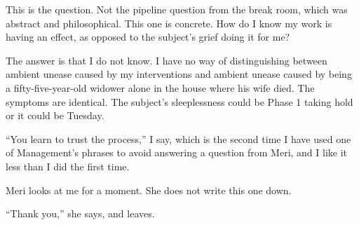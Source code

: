 This is the question. Not the pipeline question from the break room, which was abstract and philosophical. This one is concrete. How do I know my work is having an effect, as opposed to the subject's grief doing it for me?

The answer is that I do not know. I have no way of distinguishing between ambient unease caused by my interventions and ambient unease caused by being a fifty-five-year-old widower alone in the house where his wife died. The symptoms are identical. The subject's sleeplessness could be Phase 1 taking hold or it could be Tuesday.

``You learn to trust the process,'' I say, which is the second time I have used one of Management's phrases to avoid answering a question from Meri, and I like it less than I did the first time.

Meri looks at me for a moment. She does not write this one down.

``Thank you,'' she says, and leaves.
